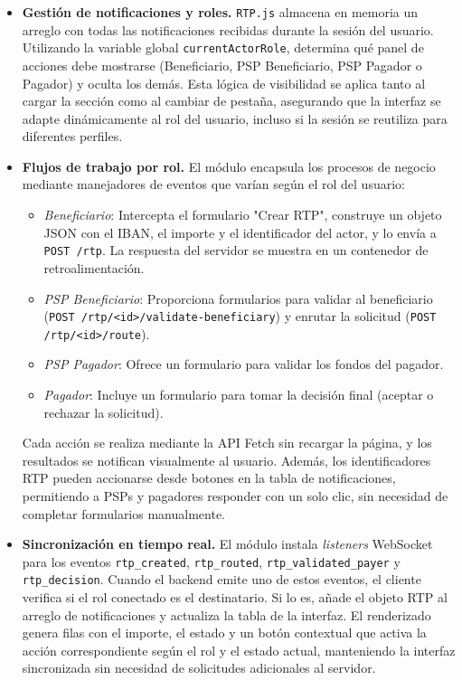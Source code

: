 \begin{itemize}
\begin{itemize}
            \item \textbf{Gestión de notificaciones y roles.} \texttt{RTP.js} almacena en memoria un arreglo con todas las notificaciones recibidas durante la sesión del usuario. Utilizando la variable global \texttt{currentActorRole}, determina qué panel de acciones debe mostrarse (Beneficiario, PSP Beneficiario, PSP Pagador o Pagador) y oculta los demás. Esta lógica de visibilidad se aplica tanto al cargar la sección como al cambiar de pestaña, asegurando que la interfaz se adapte dinámicamente al rol del usuario, incluso si la sesión se reutiliza para diferentes perfiles.

            \item \textbf{Flujos de trabajo por rol.} El módulo encapsula los procesos de negocio mediante manejadores de eventos que varían según el rol del usuario:
            \begin{itemize}
                \item \textit{Beneficiario}: Intercepta el formulario "Crear RTP", construye un objeto JSON con el IBAN, el importe y el identificador del actor, y lo envía a \texttt{POST /rtp}. La respuesta del servidor se muestra en un contenedor de retroalimentación.
                \item \textit{PSP Beneficiario}: Proporciona formularios para validar al beneficiario (\texttt{POST /rtp/<id>/validate-beneficiary}) y enrutar la solicitud (\texttt{POST /rtp/<id>/route}).
                \item \textit{PSP Pagador}: Ofrece un formulario para validar los fondos del pagador.
                \item \textit{Pagador}: Incluye un formulario para tomar la decisión final (aceptar o rechazar la solicitud).
            \end{itemize}
            Cada acción se realiza mediante la API Fetch sin recargar la página, y los resultados se notifican visualmente al usuario. Además, los identificadores RTP pueden accionarse desde botones en la tabla de notificaciones, permitiendo a PSPs y pagadores responder con un solo clic, sin necesidad de completar formularios manualmente.

            \item \textbf{Sincronización en tiempo real.} El módulo instala \textit{listeners} WebSocket para los eventos \texttt{rtp\_created}, \texttt{rtp\_routed}, \texttt{rtp\_validated\_payer} y \texttt{rtp\_decision}. Cuando el backend emite uno de estos eventos, el cliente verifica si el rol conectado es el destinatario. Si lo es, añade el objeto RTP al arreglo de notificaciones y actualiza la tabla de la interfaz. El renderizado genera filas con el importe, el estado y un botón contextual que activa la acción correspondiente según el rol y el estado actual, manteniendo la interfaz sincronizada sin necesidad de solicitudes adicionales al servidor.


\end{itemize}
\end{itemize}
